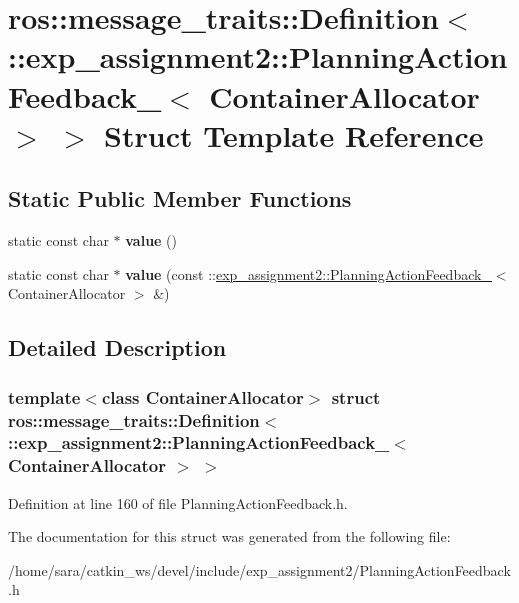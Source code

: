 \hypertarget{structros_1_1message__traits_1_1Definition_3_01_1_1exp__assignment2_1_1PlanningActionFeedback___afdbd9cec82523586e2ef971284bd9b6}{}\section{ros\+:\+:message\+\_\+traits\+:\+:Definition$<$ \+:\+:exp\+\_\+assignment2\+:\+:Planning\+Action\+Feedback\+\_\+$<$ Container\+Allocator $>$ $>$ Struct Template Reference}
\label{structros_1_1message__traits_1_1Definition_3_01_1_1exp__assignment2_1_1PlanningActionFeedback___afdbd9cec82523586e2ef971284bd9b6}
\subsection*{Static Public Member Functions}
\begin{DoxyCompactItemize}
\item 
\mbox{\label{structros_1_1message__traits_1_1Definition_3_01_1_1exp__assignment2_1_1PlanningActionFeedback___afdbd9cec82523586e2ef971284bd9b6_ad30086373df11ae7e1429e5d607155b4}} 
static const char $\ast$ {\bfseries value} ()
\item 
\mbox{\label{structros_1_1message__traits_1_1Definition_3_01_1_1exp__assignment2_1_1PlanningActionFeedback___afdbd9cec82523586e2ef971284bd9b6_aa10c410e39bc2c3270fbd1cc8c4a7e41}} 
static const char $\ast$ {\bfseries value} (const \+::\hyperlink{structexp__assignment2_1_1PlanningActionFeedback__}{exp\+\_\+assignment2\+::\+Planning\+Action\+Feedback\+\_\+}$<$ Container\+Allocator $>$ \&)
\end{DoxyCompactItemize}


\subsection{Detailed Description}
\subsubsection*{template$<$class Container\+Allocator$>$\newline
struct ros\+::message\+\_\+traits\+::\+Definition$<$ \+::exp\+\_\+assignment2\+::\+Planning\+Action\+Feedback\+\_\+$<$ Container\+Allocator $>$ $>$}



Definition at line 160 of file Planning\+Action\+Feedback.\+h.



The documentation for this struct was generated from the following file\+:\begin{DoxyCompactItemize}
\item 
/home/sara/catkin\+\_\+ws/devel/include/exp\+\_\+assignment2/Planning\+Action\+Feedback.\+h\end{DoxyCompactItemize}
